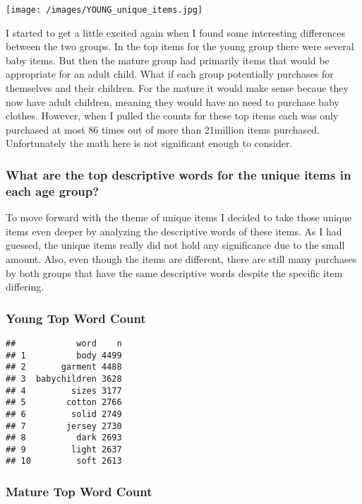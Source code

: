 \documentclass[
]{article}
\begin{document}
\texttt{[image: /images/YOUNG\_unique\_items.jpg]}

I started to get a little excited again when I found some interesting
differences between the two groups. In the top items for the young group
there were several baby items. But then the mature group had primarily
items that would be appropriate for an adult child. What if each group
potentially purchases for themselves and their children. For the mature
it would make sense becaue they now have adult children, meaning they
would have no need to purchase baby clothes. However, when I pulled the
counts for these top items each was only purchased at most 86 times out
of more than 21million items purchased. Unfortunately the math here is
not significant enough to consider.

\hypertarget{what-are-the-top-descriptive-words-for-the-unique-items-in-each-age-group}{%
\subsubsection{What are the top descriptive words for the unique items
in each age
group?}\label{what-are-the-top-descriptive-words-for-the-unique-items-in-each-age-group}}

To move forward with the theme of unique items I decided to take those
unique items even deeper by analyzing the descriptive words of these
items. As I had guessed, the unique items really did not hold any
significance due to the small amount. Also, even though the items are
different, there are still many purchases by both groups that have the
same descriptive words despite the specific item differing.

\hypertarget{young-top-word-count}{%
\subsubsection{Young Top Word Count}\label{young-top-word-count}}

\begin{verbatim}
##            word    n
## 1          body 4499
## 2       garment 4488
## 3  babychildren 3628
## 4         sizes 3177
## 5        cotton 2766
## 6         solid 2749
## 7        jersey 2730
## 8          dark 2693
## 9         light 2637
## 10         soft 2613
\end{verbatim}

\hypertarget{mature-top-word-count}{%
\subsubsection{Mature Top Word Count}\label{mature-top-word-count}}
\end{document}
